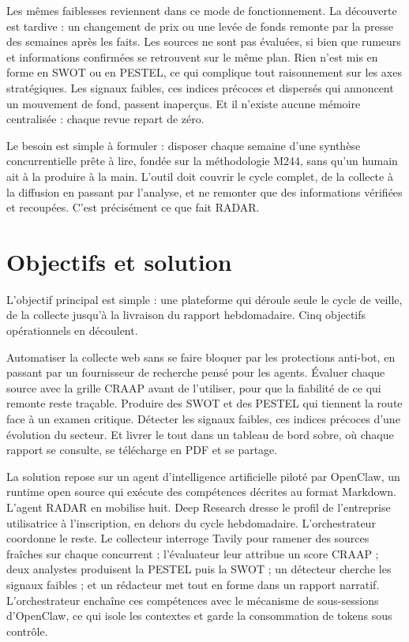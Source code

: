 \documentclass[12pt,a4paper,openany]{report}
\begin{document}
Les mêmes faiblesses reviennent dans ce mode de fonctionnement. La découverte est tardive : un changement de prix ou une levée de fonds remonte par la presse des semaines après les faits. Les sources ne sont pas évaluées, si bien que rumeurs et informations confirmées se retrouvent sur le même plan. Rien n'est mis en forme en SWOT ou en PESTEL, ce qui complique tout raisonnement sur les axes stratégiques. Les signaux faibles, ces indices précoces et dispersés qui annoncent un mouvement de fond, passent inaperçus. Et il n'existe aucune mémoire centralisée : chaque revue repart de zéro.

Le besoin est simple à formuler : disposer chaque semaine d'une synthèse concurrentielle prête à lire, fondée sur la méthodologie M244, sans qu'un humain ait à la produire à la main. L'outil doit couvrir le cycle complet, de la collecte à la diffusion en passant par l'analyse, et ne remonter que des informations vérifiées et recoupées. C'est précisément ce que fait RADAR.

\section{Objectifs et solution}
\label{sec:objectifs-solution}

L'objectif principal est simple : une plateforme qui déroule seule le cycle de veille, de la collecte jusqu'à la livraison du rapport hebdomadaire. Cinq objectifs opérationnels en découlent.

Automatiser la collecte web sans se faire bloquer par les protections anti-bot, en passant par un fournisseur de recherche pensé pour les agents. Évaluer chaque source avec la grille CRAAP avant de l'utiliser, pour que la fiabilité de ce qui remonte reste traçable. Produire des SWOT et des PESTEL qui tiennent la route face à un examen critique. Détecter les signaux faibles, ces indices précoces d'une évolution du secteur. Et livrer le tout dans un tableau de bord sobre, où chaque rapport se consulte, se télécharge en PDF et se partage.

La solution repose sur un agent d'intelligence artificielle piloté par OpenClaw, un runtime open source qui exécute des compétences décrites au format Markdown. L'agent RADAR en mobilise huit. Deep Research dresse le profil de l'entreprise utilisatrice à l'inscription, en dehors du cycle hebdomadaire. L'orchestrateur coordonne le reste. Le collecteur interroge Tavily pour ramener des sources fraîches sur chaque concurrent ; l'évaluateur leur attribue un score CRAAP ; deux analystes produisent la PESTEL puis la SWOT ; un détecteur cherche les signaux faibles ; et un rédacteur met tout en forme dans un rapport narratif. L'orchestrateur enchaîne ces compétences avec le mécanisme de sous-sessions d'OpenClaw, ce qui isole les contextes et garde la consommation de tokens sous contrôle.
\end{document}
